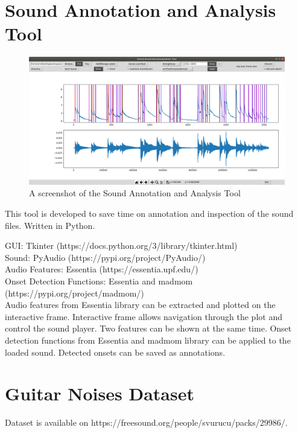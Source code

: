 \appendix
\chapter{Sound Annotation and Analysis Tool}\label{appendix:a} %

\begin{figure}
    \centering
    \includegraphics[width=\columnwidth]{appendix/saat.png}
    \caption{A screenshot of the Sound Annotation and Analysis Tool}
    \label{fig:saat}
\end{figure}

This tool is developed to save time on annotation and inspection of the sound files. Written in Python.

GUI: Tkinter (https://docs.python.org/3/library/tkinter.html)\\
Sound: PyAudio (https://pypi.org/project/PyAudio/)\\
Audio Features: Essentia (https://essentia.upf.edu/)\\
Onset Detection Functions: Essentia and madmom (https://pypi.org/project/madmom/)\\

Audio features from Essentia library can be extracted and plotted on the interactive frame. Interactive frame allows navigation through the plot and control the sound player. Two features can be shown at the same time. 
Onset detection functions from Essentia and madmom library can be applied to the loaded sound. Detected onsets can be saved as annotations.

\newpage

\chapter{Guitar Noises Dataset}\label{appendix:b}

Dataset is available on https://freesound.org/people/svurucu/packs/29986/.

